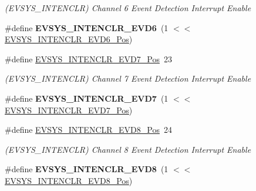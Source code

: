 \begin{DoxyCompactItemize}
\begin{DoxyCompactList}\small\item\em (E\+V\+S\+Y\+S\+\_\+\+I\+N\+T\+E\+N\+C\+L\+R) Channel 6 Event Detection Interrupt Enable \end{DoxyCompactList}\item 
\hypertarget{group___s_a_m_l21___e_v_s_y_s_ga18d08aa89acc3a148d96464cef76ac96}{}\#define {\bfseries E\+V\+S\+Y\+S\+\_\+\+I\+N\+T\+E\+N\+C\+L\+R\+\_\+\+E\+V\+D6}~(1 $<$$<$ \hyperlink{group___s_a_m_l21___e_v_s_y_s_ga1e548947abb6863da33c41d8128be55f}{E\+V\+S\+Y\+S\+\_\+\+I\+N\+T\+E\+N\+C\+L\+R\+\_\+\+E\+V\+D6\+\_\+\+Pos})\label{group___s_a_m_l21___e_v_s_y_s_ga18d08aa89acc3a148d96464cef76ac96}

\item 
\hypertarget{group___s_a_m_l21___e_v_s_y_s_ga7a71b872d9ee655bc2bd65aa5c6bd3bf}{}\#define \hyperlink{group___s_a_m_l21___e_v_s_y_s_ga7a71b872d9ee655bc2bd65aa5c6bd3bf}{E\+V\+S\+Y\+S\+\_\+\+I\+N\+T\+E\+N\+C\+L\+R\+\_\+\+E\+V\+D7\+\_\+\+Pos}~23\label{group___s_a_m_l21___e_v_s_y_s_ga7a71b872d9ee655bc2bd65aa5c6bd3bf}

\begin{DoxyCompactList}\small\item\em (E\+V\+S\+Y\+S\+\_\+\+I\+N\+T\+E\+N\+C\+L\+R) Channel 7 Event Detection Interrupt Enable \end{DoxyCompactList}\item 
\hypertarget{group___s_a_m_l21___e_v_s_y_s_ga27e577049bff237e112ae437e5785eed}{}\#define {\bfseries E\+V\+S\+Y\+S\+\_\+\+I\+N\+T\+E\+N\+C\+L\+R\+\_\+\+E\+V\+D7}~(1 $<$$<$ \hyperlink{group___s_a_m_l21___e_v_s_y_s_ga7a71b872d9ee655bc2bd65aa5c6bd3bf}{E\+V\+S\+Y\+S\+\_\+\+I\+N\+T\+E\+N\+C\+L\+R\+\_\+\+E\+V\+D7\+\_\+\+Pos})\label{group___s_a_m_l21___e_v_s_y_s_ga27e577049bff237e112ae437e5785eed}

\item 
\hypertarget{group___s_a_m_l21___e_v_s_y_s_ga85400abd9d7ec1d4ffb5c25d41c52467}{}\#define \hyperlink{group___s_a_m_l21___e_v_s_y_s_ga85400abd9d7ec1d4ffb5c25d41c52467}{E\+V\+S\+Y\+S\+\_\+\+I\+N\+T\+E\+N\+C\+L\+R\+\_\+\+E\+V\+D8\+\_\+\+Pos}~24\label{group___s_a_m_l21___e_v_s_y_s_ga85400abd9d7ec1d4ffb5c25d41c52467}

\begin{DoxyCompactList}\small\item\em (E\+V\+S\+Y\+S\+\_\+\+I\+N\+T\+E\+N\+C\+L\+R) Channel 8 Event Detection Interrupt Enable \end{DoxyCompactList}\item 
\hypertarget{group___s_a_m_l21___e_v_s_y_s_gaba6341d7b1c5e957a5102bd383dbb2ca}{}\#define {\bfseries E\+V\+S\+Y\+S\+\_\+\+I\+N\+T\+E\+N\+C\+L\+R\+\_\+\+E\+V\+D8}~(1 $<$$<$ \hyperlink{group___s_a_m_l21___e_v_s_y_s_ga85400abd9d7ec1d4ffb5c25d41c52467}{E\+V\+S\+Y\+S\+\_\+\+I\+N\+T\+E\+N\+C\+L\+R\+\_\+\+E\+V\+D8\+\_\+\+Pos})\label{group___s_a_m_l21___e_v_s_y_s_gaba6341d7b1c5e957a5102bd383dbb2ca}


\end{DoxyCompactItemize}
